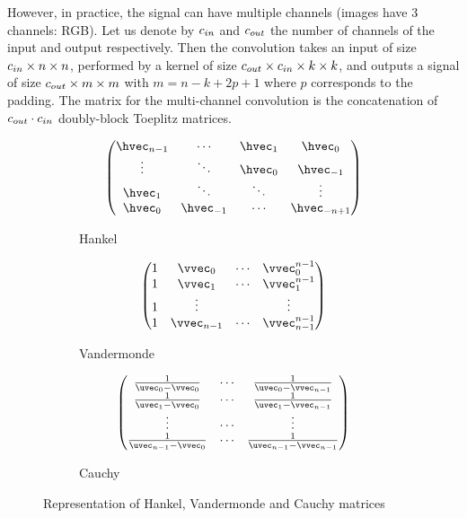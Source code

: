 However, in practice, the signal can have multiple channels (\eg images have 3 channels: RGB).
Let us denote by $c_{in}$ and $c_{out}$ the number of channels of the input and output respectively.
Then the convolution takes an input of size $c_{in} \times n \times n$, performed by a kernel of size $c_{out} \times c_{in} \times k \times k$, and outputs a signal of size $c_{out} \times m \times m$ with $m = n - k + 2p + 1$ where $p$ corresponds to the padding.
The matrix for the multi-channel convolution is the concatenation of $c_{out} \cdot c_{in}$ doubly-block Toeplitz matrices.



\begin{figure}[htb]
   \centering
   \begin{subfigure}[b]{0.32\textwidth}
       \centering
       \begin{equation*}
	  \leftmatrix
	     \hvec_{n-1} & \cdots     & \hvec_1 & \hvec_0      \\
	     \vdots      & \ddots     & \hvec_0 & \hvec_{-1}   \\
	     \hvec_1     & \ddots     & \ddots  & \vdots       \\
	     \hvec_0     & \hvec_{-1} & \cdots  & \hvec_{-n+1} \\
	  \rightmatrix
       \end{equation*}
       \caption*{Hankel}
   \end{subfigure}
   \hfill
   \begin{subfigure}[b]{0.32\textwidth}
       \centering
       \begin{equation*}
	  \leftmatrix
	    1 & \vvec_0     & \cdots & \vvec_0^{n-1} \\
	    1 & \vvec_1     & \cdots & \vvec_1^{n-1} \\
	    1 & \vdots      &        & \vdots        \\
	    1 & \vvec_{n-1} & \cdots & \vvec_{n-1}^{n-1}
	  \rightmatrix
       \end{equation*}
       \caption*{Vandermonde}
   \end{subfigure}
   \hfill
   \begin{subfigure}[b]{0.32\textwidth}
       \centering
       \begin{equation*}
	  \leftmatrix
	  \frac{1}{\uvec_0 - \vvec_{0}}     & \cdots & \frac{1}{\uvec_0 - \vvec_{n-1}} \\
	  \frac{1}{\uvec_1 - \vvec_{0}}     & \cdots & \frac{1}{\uvec_1 - \vvec_{n-1}} \\
	  \vdots                            & \cdots & \vdots                          \\
	  \frac{1}{\uvec_{n-1} - \vvec_{0}} & \cdots & \frac{1}{\uvec_{n-1} - \vvec_{n-1}}
	  \rightmatrix
       \end{equation*}
       \caption*{Cauchy}
   \end{subfigure}
   \caption{Representation of Hankel, Vandermonde and Cauchy matrices}
  \label{figure:ch2-example_structure_matrices}
\end{figure}



